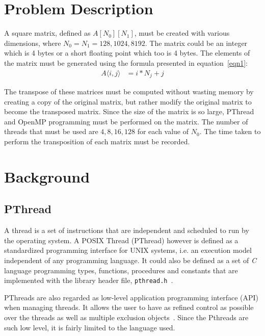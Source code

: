 \documentclass[10pt, conference]{IEEEtran}
\def\code#1{\texttt{#1}}
\begin{document}
\section{Problem Description}
\label{Problem Description}
A square matrix, defined as $A[N_0][N_1]$, must be created with various dimensions, where $N_0 = N_1 = 128, 1024,8192$. The matrix could be an integer which is 4 bytes or a short floating point which too is 4 bytes. The elements of the matrix must be generated using the formula presented in equation~\ref{eqn1}:
\begin{equation}
\label{eqn1}
\begin{split}
A\langle i, j\rangle & = i *N_j + j
\end{split}
\end{equation}

The transpose of these matrices must be computed without wasting memory by creating a copy of the original matrix, but rather modify the original matrix to become the transposed matrix. Since the size of the matrix is so large, PThread and OpenMP programming must be performed on the matrix. The number of threads that must be used are $4,8,16,128$ for each value of $N_0$. The time taken to perform the transposition of each matrix must be recorded.

\section{Background}
\label{Background}

\subsection{PThread}
\label{PThread}
A thread is a set of instructions that are independent and scheduled to run by the operating system. A POSIX Thread (PThread) however is defined as a standardized programming interface for UNIX systems, i.e. an execution model independent of any programming language. It could also be defined as a set of \emph{C} language programming types, functions, procedures and constants that are implemented with the library header file, \code{pthread.h}~\cite{PThread}.

PThreads are also regarded as low-level application programming interface (API) when managing threads. It allows the user to have as refined control as possible over the threads as well as multiple exclusion objects~\cite{StackOverflow}. Since the Pthreads are such low level, it is fairly limited to the language used.
\end{document}
